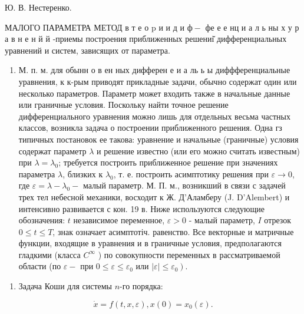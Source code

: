 \documentclass[10pt]{article}
\begin{document}
Ю. В. Нестеренко.



МАЛОГО ПАРАМЕТРА МЕТОД в т е о $\mathrm{p}$ и и д и $ф-$ фе е е нц и а л ь ны х у р а в н е н й й -приемы построения приближенных решениі̆ дифференциальных уравнений и систем, зависящих от параметра.



\begin{enumerate}

  \item М. п. м. для обынн о в ен ных дифферен е и а ль ь ы диффференциальные уравнения, к к-рым приводят прикладные задачи, обычно содержат один или несколько параметров. Параметр может входить также в начальные данные или граничные условия. Поскольку найти точное решение дифференциального уравнения можно лишь для отдельных весьма частных классов, возникла задача о построении приближенного решения. Одна гз типичных постановок ее такова: уравнение и начальные (граничные) условия содержат параметр $\lambda$ и решение известно (или его можно считать известным) при $\lambda=\lambda_{0}$; требуется построить приближенное решение при значениях параметра $\lambda$, близких к $\lambda_{0}$, т. е. построить асимптотику решения при $\varepsilon \rightarrow 0$, где $\varepsilon=\lambda-\lambda_{0}-$ малый параметр. М. П. м., возникший в связи с задачей трех тел небесной механики, восходит к Ж. Д'Аламберу (J. D'Alembert) и интенсивно развивается с кон. 19 в. Ниже используются следующие обозначения: $t$ независимое переменное, $\varepsilon>0$ - малый параметр, $I$ отрезок $0 \leqslant t \leqslant T$, знак означает асимптотіч. равенство. Все векторные и матричные функции, входящие в уравнения и в граничные условия, предполагаются гладкими (класса $C^{\infty}$ ) по совокупности переменных в рассматриваемой области (по $\varepsilon-$ при $0 \leqslant \varepsilon \leqslant \varepsilon_{0}$ или $\left.|\varepsilon| \leqslant \varepsilon_{0}\right)$.

\end{enumerate}



\begin{enumerate}

  \item Задача Коши для системы $n$-го порядка:

\end{enumerate}



\[

\dot{x}=f(t, x, \varepsilon), x(0)=x_{0}(\varepsilon) .

\]
\end{document}
